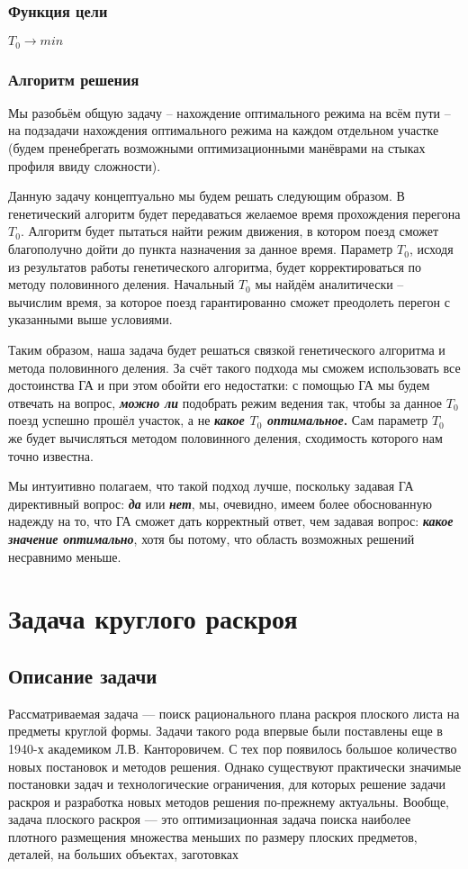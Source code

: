 \begin{itemize}
\subsubsection{Функция цели}
$T_{0}\rightarrow min$

\subsubsection{Алгоритм решения}

Мы разобьём общую задачу -- нахождение оптимального режима на всём пути -- на подзадачи нахождения оптимального режима на каждом отдельном участке (будем пренебрегать возможными оптимизационными манёврами на стыках профиля ввиду сложности).

Данную задачу концептуально мы будем решать следующим образом.
В генетический алгоритм будет передаваться желаемое время прохождения перегона $T_0$. Алгоритм будет пытаться найти режим движения, в котором поезд сможет благополучно дойти до пункта назначения за данное время. Параметр $T_0$, исходя из результатов работы генетического алгоритма, будет корректироваться по методу половинного деления. Начальный $T_0$ мы найдём аналитически -- вычислим время, за которое поезд гарантированно сможет преодолеть перегон с указанными выше условиями.

Таким образом, наша задача будет решаться связкой генетического алгоритма и метода половинного деления. За счёт такого подхода мы сможем использовать все достоинства ГА и при этом обойти его недостатки: с помощью ГА мы будем отвечать на вопрос, \textbf{\textit{можно ли}} подобрать режим ведения так, чтобы за данное $T_0$ поезд успешно прошёл участок, а не \textbf{\textit{какое $T_0$ оптимальное}.} Сам параметр $T_0$ же будет вычисляться методом половинного деления, сходимость которого нам точно известна.

Мы интуитивно полагаем, что такой подход лучше, поскольку задавая ГА директивный вопрос: \textbf{\textit{да}} или \textbf{\textit{нет}}, мы, очевидно, имеем более обоснованную надежду на то, что ГА сможет дать корректный ответ, чем задавая вопрос: \textbf{\textit{какое значение оптимально}}, хотя бы потому, что область возможных решений несравнимо меньше.

\section{Задача круглого раскроя}
\subsection{Описание задачи}
Рассматриваемая задача — поиск рационального плана раскроя плоского листа на предметы круглой формы. Задачи такого рода впервые
были поставлены еще в 1940-х академиком Л.В. Канторовичем. С тех пор появилось большое количество новых постановок и методов решения. Однако существуют практически значимые 
постановки задач и технологические ограничения, для которых решение задачи раскроя и
разработка новых методов решения по-прежнему актуальны.
Вообще, задача плоского раскроя — это оптимизационная задача поиска наиболее плотного размещения множества меньших по размеру 
плоских предметов, деталей, на больших объектах, заготовках


\end{itemize}
